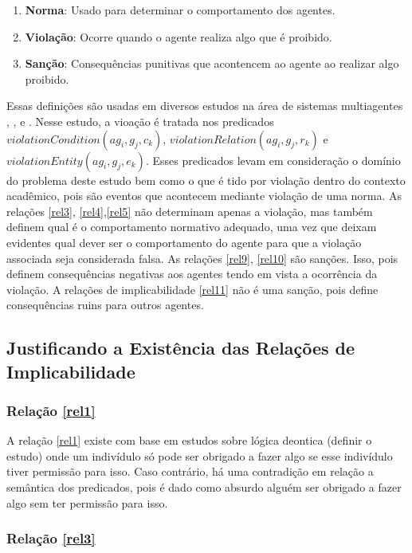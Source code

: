 \documentclass[12pt]{article}
\begin{document}
\begin{enumerate}
	\item \textbf{Norma}: Usado para determinar o comportamento dos agentes.
	\item \textbf{Violação}: Ocorre quando o agente realiza algo que é proibido.
	\item \textbf{Sanção}: Consequências punitivas que acontencem ao agente ao realizar algo proibido.	
\end{enumerate}

Essas definições são usadas em diversos estudos na área de sistemas multiagentes \cite{dastaniNormativeMultiAgentProgram}, \cite{multiagentsystem}, \cite{amodelmultiagentsystemdynamicrelationship} e \cite{ontologynormative}. Nesse estudo, a vioação é tratada nos predicados $violationCondition(ag_i,g_j,c_k)$, $violationRelation(ag_i,g_j,r_k)$ e $violationEntity(ag_i,g_j,e_k)$. Esses predicados levam em consideração o domínio do problema deste estudo bem como o que é tido por violação dentro do contexto acadêmico, pois são eventos que acontecem mediante violação de uma norma. As relações \ref{rel3}, \ref{rel4},\ref{rel5} não determinam apenas a violação, mas também definem qual é o comportamento normativo adequado, uma vez que deixam evidentes qual dever ser o comportamento do agente para que a violação associada seja considerada falsa. As relações \ref{rel9}, \ref{rel10} são sanções. Isso, pois definem consequências negativas aos agentes tendo em vista a ocorrência da violação. A relações de implicabilidade \ref{rel11} não é uma sanção, pois define consequências ruins para outros agentes. 


\subsection{Justificando a Existência das Relações de Implicabilidade}


\subsubsection{Relação \ref{rel1}}
A relação \ref{rel1} existe com base em estudos sobre lógica deontica (definir o estudo) onde um indivídulo só pode ser obrigado a fazer algo se esse indivídulo tiver permissão para isso. Caso contrário, há uma contradição em relação a semântica dos predicados, pois é dado como absurdo alguém ser obrigado a fazer algo sem ter permissão para isso. 


\subsubsection{Relação \ref{rel3}}
\end{document}
